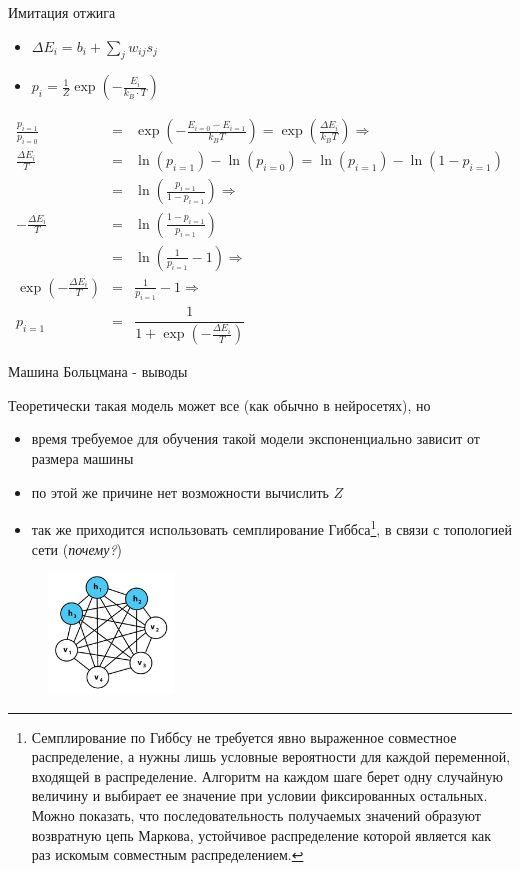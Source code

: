 \documentclass[10pt]{beamer}
\begin{document}
\begin{frame}{Имитация отжига}

\begin{itemize}
	\item $\Delta E_i = b_i +\sum_j w_{ij}s_j$
	\item $p_i = \frac{1}{Z} \exp \left( -\frac{E_i}{k_B\cdot T} \right)$
\end{itemize}

\begin{eqnarray*}
\frac{p_{i=1}}{p_{i=0}} &=& \exp\left( -\frac{E_{i=0} - E_{i=1}}{k_B T} \right) = \exp\left( \frac{\Delta E_i}{k_B T} \right) \Rightarrow\\
\frac{\Delta E_i}{T} &=& \ln(p_{i = 1}) - \ln(p_{i = 0}) = \ln(p_{i = 1}) - \ln(1 - p_{i = 1})\\
&=& \ln\left(\frac{p_{i = 1}}{1 - p_{i = 1}}\right) \Rightarrow\\
-\frac{\Delta E_i}{T} &=& \ln\left(\frac{1 - p_{i = 1}}{p_{i = 1}}\right) \\
&=& \ln\left(\frac{1}{p_{i = 1}} - 1\right) \Rightarrow \\
\exp\left(-\frac{\Delta E_i}{T}\right) &=& \frac{1}{p_{i = 1}} - 1 \Rightarrow\\
p_{i=1} &=& \dfrac{1}{1 + \exp\left(-\frac{\Delta E_i}{T}\right)}
\end{eqnarray*}

\end{frame}


\begin{frame}{Машина Больцмана - выводы}

Теоретически такая модель может все (как обычно в нейросетях), но
\begin{itemize}
	\item время требуемое для обучения такой модели экспоненциально зависит от размера машины 
	\item по этой же причине нет возможности вычислить $Z$
	\item так же приходится использовать семплирование Гиббса\footnote{Семплирование по Гиббсу не требуется явно выраженное совместное распределение, а нужны лишь условные вероятности для каждой переменной, входящей в распределение. Алгоритм на каждом шаге берет одну случайную величину и выбирает ее значение при условии фиксированных остальных. Можно показать, что последовательность получаемых значений образуют возвратную цепь Маркова, устойчивое распределение которой является как раз искомым совместным распределением.}, в связи с топологией сети (\textit{почему?})
\end{itemize}
\begin{figure}[h!]
  \centering
  \includegraphics[width=0.3\textwidth]{images/bm.png}
\end{figure}

\end{frame}
\end{document}
